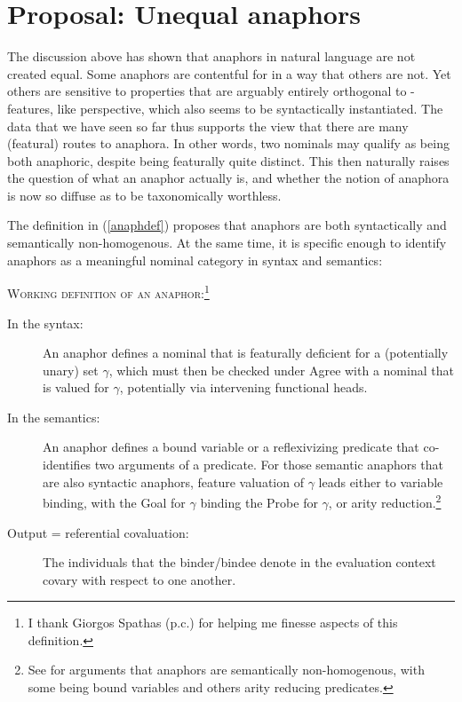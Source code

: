 \documentclass[output=paper, modfonts, nonflat]{langsci/langscibook}
\begin{document}
\section{Proposal: Unequal anaphors}
\label{secclass}

The discussion above has shown that anaphors in natural language are
not created equal. Some anaphors are contentful for \person{} in a way
that others are not. Yet others are sensitive to properties that are
arguably entirely orthogonal to \ph-features, like perspective, which
also seems to be syntactically instantiated. The data that we have
seen so far thus supports the view that there are many (featural)
routes to anaphora. In other words, two nominals may qualify as being
both anaphoric, despite being featurally quite distinct. This then
naturally raises the question of what an anaphor actually is, and
whether the notion of anaphora is now so diffuse as to be
taxonomically worthless.

The definition in (\ref{anaphdef}) proposes that anaphors are both
syntactically and semantically non-homogenous. At the same time, it is
specific enough to identify anaphors as a meaningful nominal category
in syntax and semantics: 
\pagebreak
  \begin{exe}
    \ex\label{anaphdef} \textsc{Working definition of an
      anaphor:\footnote{I thank Giorgos Spathas (p.c.) for helping me
        finesse aspects of this definition.}}
\begin{description}
\item[In the syntax:] An anaphor defines a nominal that is featurally
  deficient for a (potentially unary) set $\gamma$, which must then be
  checked under Agree with a nominal that is valued for $\gamma$,
  potentially via intervening functional heads.
\item[In the semantics:] An anaphor defines a bound variable or a
  reflexivizing predicate that co-identifies two arguments of a
  predicate. For those semantic anaphors that are also syntactic
  anaphors, feature valuation of $\gamma$ leads either to variable
  binding, with the Goal for $\gamma$ binding the Probe for $\gamma$,
  or arity reduction.\footnote{See \citet{spathas:2010, spathas:2015}
    for arguments that anaphors are semantically non-homogenous, with
    some being bound variables and others arity reducing predicates.}
\item[Output = referential covaluation:] The individuals that the
  binder/bindee denote in the evaluation context covary with respect
  to one another. 
  \end{description}
\end{exe}
\end{document}
